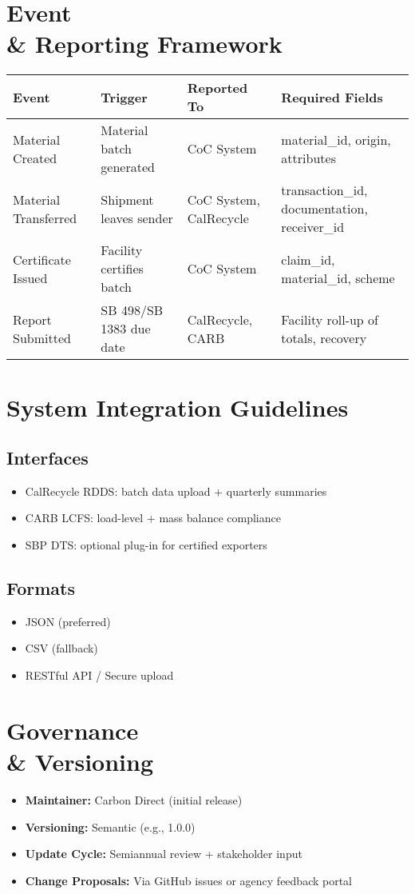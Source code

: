 \documentclass{article}
\begin{document}
\section{Event \\& Reporting Framework}
\begin{longtable}{|p{4cm}|p{4cm}|p{4cm}|p{4cm}|}
\hline
\textbf{Event} & \textbf{Trigger} & \textbf{Reported To} & \textbf{Required Fields} \\
\hline
Material Created & Material batch generated & CoC System & material\_id, origin, attributes \\
Material Transferred & Shipment leaves sender & CoC System, CalRecycle & transaction\_id, documentation, receiver\_id \\
Certificate Issued & Facility certifies batch & CoC System & claim\_id, material\_id, scheme \\
Report Submitted & SB 498/SB 1383 due date & CalRecycle, CARB & Facility roll-up of totals, recovery \\
\hline
\end{longtable}

\section{System Integration Guidelines}
\subsection*{Interfaces}
\begin{itemize}[noitemsep]
    \item CalRecycle RDDS: batch data upload + quarterly summaries
    \item CARB LCFS: load-level + mass balance compliance
    \item SBP DTS: optional plug-in for certified exporters
\end{itemize}

\subsection*{Formats}
\begin{itemize}[noitemsep]
    \item JSON (preferred)
    \item CSV (fallback)
    \item RESTful API / Secure upload
\end{itemize}

\section{Governance \\& Versioning}
\begin{itemize}[noitemsep]
    \item \textbf{Maintainer:} Carbon Direct (initial release)
    \item \textbf{Versioning:} Semantic (e.g., 1.0.0)
    \item \textbf{Update Cycle:} Semiannual review + stakeholder input
    \item \textbf{Change Proposals:} Via GitHub issues or agency feedback portal
\end{itemize}
\end{document}
